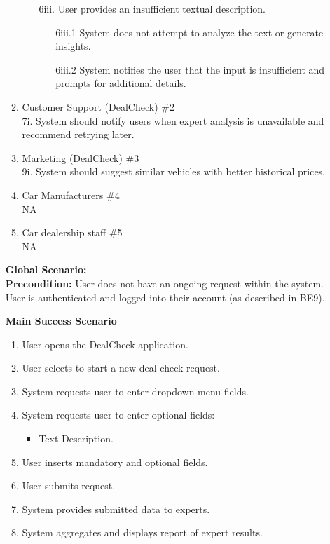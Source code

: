\documentclass[]{article}
\begin{document}
\begin{enumerate}[{\bf {BE}1.}]
\begin{enumerate}[{\bf VP1.}]
\begin{enumerate}
			\item [6iii.] User provides an insufficient textual description.
			\begin{enumerate}
				\item [6iii.1] System does not attempt to analyze the text or generate insights.
				\item [6iii.2] System notifies the user that the input is insufficient and prompts for additional details.
			\end{enumerate}
		\end{enumerate}
    
        \item Customer Support (DealCheck) \#2 \\
            7i. System should notify users when expert analysis is unavailable and recommend retrying later.
        \item Marketing (DealCheck) \#3 \\
            9i. System should suggest similar vehicles with better historical prices.
        \item Car Manufacturers \#4 \\
            NA
        \item Car dealership staff \#5 \\
            NA
    \end{enumerate}
    {\bf Global Scenario:}\\
    {\bf Precondition:} User does not have an ongoing request within the system. User is authenticated and logged into their account (as described in BE9).
    
    {\bf Main Success Scenario}
        \begin{enumerate}[1.]
            \item User opens the DealCheck application.
            \item User selects to start a new deal check request.
            \item System requests user to enter dropdown menu fields.
            \item System requests user to enter optional fields:
            \begin{itemize}
                \item Text Description.
            \end{itemize}
            \item User inserts mandatory and optional fields.
            \item User submits request.
            \item System provides submitted data to experts.
            \item System aggregates and displays report of expert results.
        \end{enumerate}
        

\end{enumerate}
\end{document}
